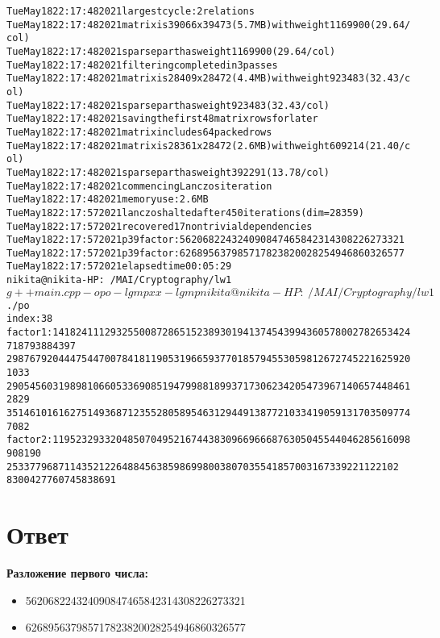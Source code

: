 \documentclass[pdf, unicode, 12pt, a4paper,oneside,fleqn]{article}
\begin{document}
\begin{alltt}
Tue May 18 22:17:48 2021  largest cycle: 2 relations
Tue May 18 22:17:48 2021  matrix is 39066 x 39473 (5.7 MB) with weight 1169900 (29.64/col)
Tue May 18 22:17:48 2021  sparse part has weight 1169900 (29.64/col)
Tue May 18 22:17:48 2021  filtering completed in 3 passes
Tue May 18 22:17:48 2021  matrix is 28409 x 28472 (4.4 MB) with weight 923483 (32.43/col)
Tue May 18 22:17:48 2021  sparse part has weight 923483 (32.43/col)
Tue May 18 22:17:48 2021  saving the first 48 matrix rows for later
Tue May 18 22:17:48 2021  matrix includes 64 packed rows
Tue May 18 22:17:48 2021  matrix is 28361 x 28472 (2.6 MB) with weight 609214 (21.40/col)
Tue May 18 22:17:48 2021  sparse part has weight 392291 (13.78/col)
Tue May 18 22:17:48 2021  commencing Lanczos iteration
Tue May 18 22:17:48 2021  memory use: 2.6 MB
Tue May 18 22:17:57 2021  lanczos halted after 450 iterations (dim = 28359)
Tue May 18 22:17:57 2021  recovered 17 nontrivial dependencies
Tue May 18 22:17:57 2021  p39 factor: 562068224324090847465842314308226273321
Tue May 18 22:17:57 2021  p39 factor: 626895637985717823820028254946860326577
Tue May 18 22:17:57 2021  elapsed time 00:05:29
nikita@nikita-HP:~/MAI/Cryptography/lw1$ g++ main.cpp -o po -lgmpxx -lgmp
nikita@nikita-HP:~/MAI/Cryptography/lw1$ ./po
index: 38
factor 1:  14182411129325500872865152389301941374543994360578002782653424718793884397\\
    29876792044475447007841811905319665937701857945530598126727452216259201033\\
    29054560319898106605336908519479988189937173062342054739671406574484612829\\
    35146101616275149368712355280589546312944913877210334190591317035097747082\\
factor 2: 11952329332048507049521674438309669666876305045544046285616098908190\\
    25337796871143521226488456385986998003807035541857003167339221122102\\
    8300427760745838691
\end{alltt}

\pagebreak

\section{Ответ}
{\bfseries Разложение первого числа:}
\begin{itemize}
    \item 562068224324090847465842314308226273321
    \item 626895637985717823820028254946860326577
\end{itemize}
\end{document}
